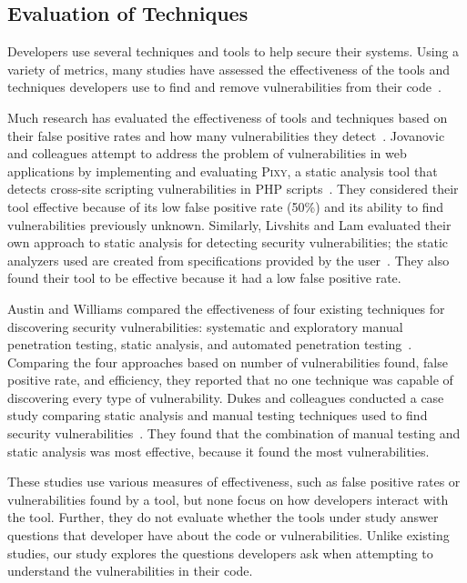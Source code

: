 \documentclass[conference]{IEEEtran}
\begin{document}
\subsection{Evaluation of Techniques}
\label{evaluation}
Developers use several techniques and tools to help secure their systems.
Using a variety of metrics, many studies have assessed the effectiveness of the tools and techniques developers use to find and remove vulnerabilities from their code~\cite{martin2005finding, austin2011one, livshits2005finding}.  

Much research has evaluated the effectiveness of tools and techniques based on their false positive rates and how many vulnerabilities they detect~\cite{jovanovic2006pixy, austin2011one, dukes2013case}. 
Jovanovic and colleagues attempt to address the problem of vulnerabilities in web applications by implementing and evaluating \textsc{Pixy}, a static analysis tool that detects cross-site scripting vulnerabilities in PHP scripts~\cite{jovanovic2006pixy}. 
They considered their tool effective because of its low false positive rate (50\%) and its ability to find vulnerabilities previously unknown. 
Similarly, Livshits and Lam evaluated their own approach to static analysis for detecting security vulnerabilities; the static analyzers used are created from specifications provided by the user~\cite{livshits2005finding}. 
They also found their tool to be effective because it had a low false positive rate. 

Austin and Williams compared the effectiveness of four existing techniques for discovering security vulnerabilities: systematic and exploratory manual  penetration testing, static analysis, and automated penetration testing~\cite{austin2011one}. 
Comparing the four approaches based on number of vulnerabilities found, false positive rate, and efficiency, they reported that no one technique was capable of discovering every type of vulnerability. 
Dukes and colleagues conducted a case study comparing static analysis and manual testing techniques used to find security vulnerabilities~\cite{dukes2013case}. 
They found that the combination of manual testing and static analysis was most effective, because it found the most vulnerabilities.


These studies use various measures of effectiveness, such as false positive rates or vulnerabilities found by a tool, but none focus on how developers interact with the tool. 
Further, they do not evaluate whether the tools under study answer questions that developer have about the code or vulnerabilities. 
Unlike existing studies, our study explores the questions developers ask when attempting to understand the vulnerabilities in their code.
\end{document}
